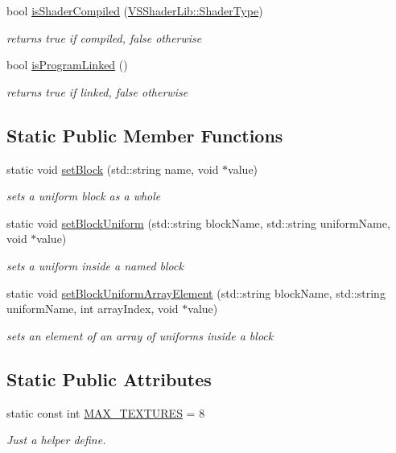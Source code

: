 \begin{DoxyCompactItemize}
bool \hyperlink{class_v_s_shader_lib_a734b05e49e117f678cdfeb6f34001c1c}{is\+Shader\+Compiled} (\hyperlink{class_v_s_shader_lib_ae8a4410569faa6d4df9760e998a9706a}{V\+S\+Shader\+Lib\+::\+Shader\+Type})
\begin{DoxyCompactList}\small\item\em returns true if compiled, false otherwise \end{DoxyCompactList}\item 
bool \hyperlink{class_v_s_shader_lib_ae60f0930d5a3b7377bf732deae0e8eea}{is\+Program\+Linked} ()
\begin{DoxyCompactList}\small\item\em returns true if linked, false otherwise \end{DoxyCompactList}\end{DoxyCompactItemize}
\subsection*{Static Public Member Functions}
\begin{DoxyCompactItemize}
\item 
static void \hyperlink{class_v_s_shader_lib_a4dded68b0735edf595dd5dbf56c956b1}{set\+Block} (std\+::string name, void $\ast$value)
\begin{DoxyCompactList}\small\item\em sets a uniform block as a whole \end{DoxyCompactList}\item 
static void \hyperlink{class_v_s_shader_lib_a456c9e16b026780dfa62d669b495b877}{set\+Block\+Uniform} (std\+::string block\+Name, std\+::string uniform\+Name, void $\ast$value)
\begin{DoxyCompactList}\small\item\em sets a uniform inside a named block \end{DoxyCompactList}\item 
static void \hyperlink{class_v_s_shader_lib_a91bc939218a7718b9dbb7e13cb9d842d}{set\+Block\+Uniform\+Array\+Element} (std\+::string block\+Name, std\+::string uniform\+Name, int array\+Index, void $\ast$value)
\begin{DoxyCompactList}\small\item\em sets an element of an array of uniforms inside a block \end{DoxyCompactList}\end{DoxyCompactItemize}
\subsection*{Static Public Attributes}
\begin{DoxyCompactItemize}
\item 
static const int \hyperlink{class_v_s_shader_lib_a36238c6b408901ce134d224f27138813}{M\+A\+X\+\_\+\+T\+E\+X\+T\+U\+R\+ES} = 8
\begin{DoxyCompactList}\small\item\em Just a helper define. \end{DoxyCompactList}\end{DoxyCompactItemize}
